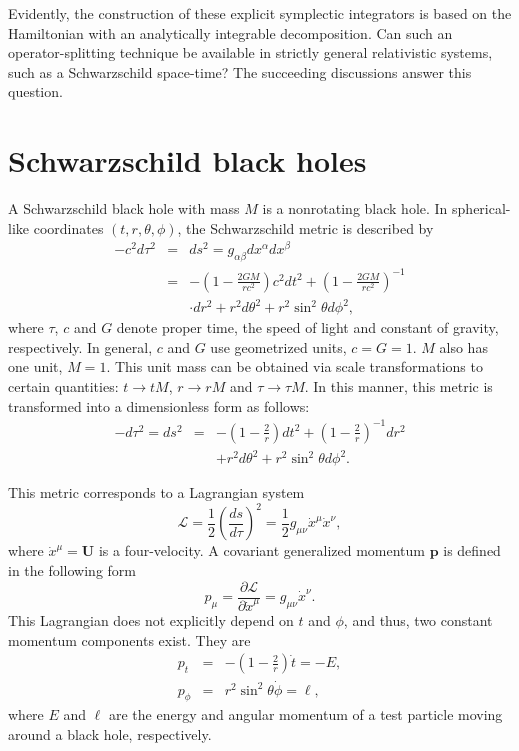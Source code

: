 \documentclass[preprint2]{aastex}
\begin{document}
Evidently, the construction of these explicit symplectic
integrators is based on the Hamiltonian with an analytically
integrable decomposition. Can such an operator-splitting technique
be available in strictly general relativistic systems, such as a
Schwarzschild space-time? The succeeding discussions answer this
question.

\section{Schwarzschild black holes}

A Schwarzschild black hole with mass $M$ is a nonrotating black
hole. In spherical-like coordinates $(t, r, \theta, \phi)$, the
Schwarzschild metric is described by
\begin{eqnarray}
-c^2d\tau^2 &=& ds^{2} = g_{\alpha\beta}dx^{\alpha}dx^{\beta} \nonumber \\
&=&
-(1-\frac{2GM}{rc^2}) c^2dt^{2} +(1-\frac{2GM}{rc^2})^{-1}   \nonumber \\
& & \cdot dr^{2}+r^{2}d \theta^{2} +r^{2}\sin^{2} \theta d \phi^2,
\end{eqnarray}
where $\tau$, $c$ and $G$ denote proper time, the speed of light
and constant of gravity, respectively. In general, $c$ and $G$ use
geometrized units, $c=G=1$. $M$ also has one unit, $M=1$. This
unit mass can be obtained via scale transformations to certain
quantities: $t\rightarrow tM$, $r\rightarrow rM$ and
$\tau\rightarrow \tau M$. In this manner, this metric is
transformed into a dimensionless form as follows:
\begin{eqnarray}
-d\tau^2 = ds^{2} &=& -(1-\frac{2}{r})dt^{2} +(1-\frac{2}{r})^{-1}
dr^{2}
\nonumber \\
& &+r^{2}d \theta^{2} +r^{2}\sin^{2} \theta d \phi^2.
\end{eqnarray}

This metric corresponds to a Lagrangian system
\begin{equation}
\mathcal{L} = \frac{1}{2} (\frac{ds}{d\tau})^2
=\frac{1}{2}g_{\mu\nu}\dot{x}^{\mu}\dot{x}^{\nu},
\end{equation}
where $\dot{x}^{\mu}=\mathbf{U}$ is a four-velocity. A covariant
generalized momentum $\mathbf{p}$ is defined in the following form
\begin{equation}
p_{\mu} = \frac{\partial \mathcal{L}}{\partial
\dot{x}^{\mu}}=g_{\mu\nu}\dot{x}^{\nu}.
\end{equation}
This Lagrangian does not explicitly depend on $t$ and $\phi$, and
thus, two constant momentum components exist. They are
\begin{eqnarray}
p_{t} &=& -(1-\frac{2}{r})\dot{t}=-E,\\
p_{\phi} &=& r^{2}\sin^{2}\theta\dot{\phi}=\ell,
\end{eqnarray}
where $E$ and $\ell$ are the energy and angular momentum of a test
particle moving around a black hole, respectively.
\end{document}

